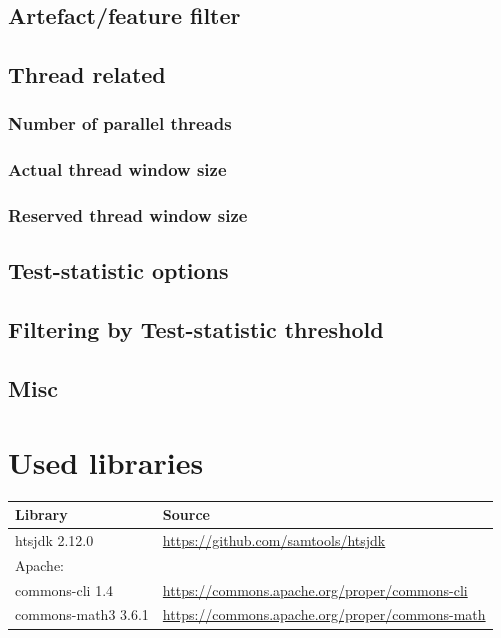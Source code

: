 \documentclass[10pt,a4paper]{article} \usepackage[utf8]{inputenc}
\begin{document}
\subsection{Artefact/feature filter}\label{sec:cli_artefact_filter}

% 
\subsection{Thread related}
\subsubsection{Number of parallel threads}

\subsubsection{Actual thread window size}

\subsubsection{Reserved thread window size}

%
\subsection{Test-statistic options}


\subsection{Filtering by Test-statistic threshold}
\subsection{Misc}


\section{Used libraries}
{\small
  \begin{tabular}{ll}
    \textbf{Library}          & \textbf{Source} \\
    \hline
    htsjdk 2.12.0             & \url{https://github.com/samtools/htsjdk} \\
    Apache:                   & \\
    \quad commons-cli 1.4     & \url{https://commons.apache.org/proper/commons-cli} \\
    \quad commons-math3 3.6.1 & \url{https://commons.apache.org/proper/commons-math}\\
  \end{tabular}
}


\end{document}
